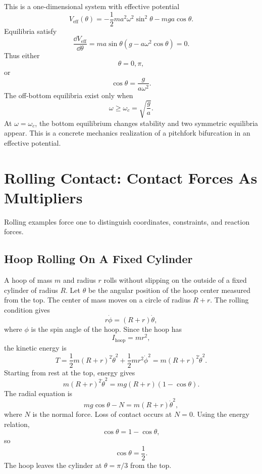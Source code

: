 This is a one-dimensional system with effective potential
\[
  V_{\mathrm{eff}}(\theta)
  =
  -\frac12ma^2\omega^2\sin^2\theta
  -
  mga\cos\theta.
\]
Equilibria satisfy
\[
  \frac{\dd V_{\mathrm{eff}}}{\dd\theta}
  =
  ma\sin\theta(g-a\omega^2\cos\theta)=0.
\]
Thus either
\[
  \theta=0,\pi,
\]
or
\[
  \cos\theta=\frac{g}{a\omega^2}.
\]
The off-bottom equilibria exist only when
\[
  \omega\geq\omega_c=\sqrt{\frac{g}{a}}.
\]
At \(\omega=\omega_c\), the bottom equilibrium changes stability and two
symmetric equilibria appear. This is a concrete mechanics realization of a
pitchfork bifurcation in an effective potential.

\section{Rolling Contact: Contact Forces As Multipliers}
\label{sec:lab-rolling-contact}

Rolling examples force one to distinguish coordinates, constraints, and
reaction forces.

\subsection{Hoop Rolling On A Fixed Cylinder}

A hoop of mass \(m\) and radius \(r\) rolls without slipping on the outside of a
fixed cylinder of radius \(R\). Let \(\theta\) be the angular position of the
hoop center measured from the top. The center of mass moves on a circle of
radius \(R+r\). The rolling condition gives
\[
  r\dot\phi=(R+r)\dot\theta,
\]
where \(\phi\) is the spin angle of the hoop. Since the hoop has
\[
  I_{\mathrm{hoop}}=mr^2,
\]
the kinetic energy is
\[
  T=
  \frac12m(R+r)^2\dot\theta^2
  +
  \frac12mr^2\dot\phi^2
  =
  m(R+r)^2\dot\theta^2.
\]
Starting from rest at the top, energy gives
\[
  m(R+r)^2\dot\theta^2
  =
  mg(R+r)(1-\cos\theta).
\]
The radial equation is
\[
  mg\cos\theta-N=m(R+r)\dot\theta^2,
\]
where \(N\) is the normal force. Loss of contact occurs at \(N=0\). Using the
energy relation,
\[
  \cos\theta=1-\cos\theta,
\]
so
\[
  \boxed{\cos\theta=\frac12.}
\]
The hoop leaves the cylinder at \(\theta=\pi/3\) from the top.

